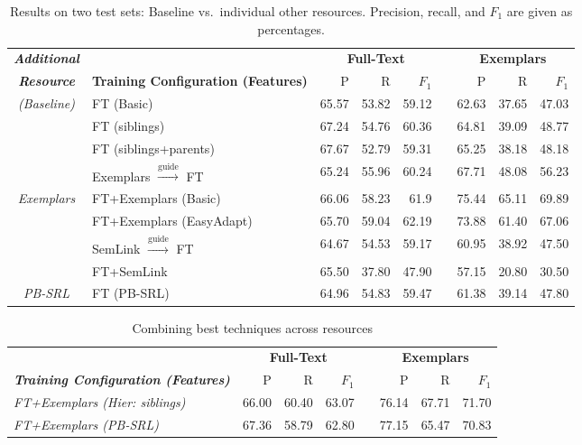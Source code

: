 \begin{table*}\centering\small
\begin{tabular}{>{\itshape}clrrr@{~~}r@{~~}rrr}
\toprule
\normalfont\textbf{Additional} & & \multicolumn{3}{c}{\textbf{Full-Text}} && \multicolumn{3}{c}{\textbf{Exemplars}} \\
\cline{3-5}\cline{7-9}
\normalfont\textbf{Resource} & \textbf{Training Configuration (Features)} & P\hphantom{11} & R\hphantom{11} & $F_1$\hphantom{0} && P\hphantom{11} & R\hphantom{11} & $F_1$\hphantom{0} \\
\midrule
(Baseline) & FT (Basic) & 65.57 & 53.82 & 59.12 && 62.63 & 37.65 & 47.03 \\
\midrule
\multirow{2}{*}{FN Hierarchy} & FT (siblings) & 67.24 & 54.76 & 60.36 && 64.81 & 39.09 & 48.77 \\
          & FT (siblings+parents) & 67.67 & 52.79 & 59.31 && 65.25 & 38.18 & 48.18 \\
\midrule
& Exemplars $\xrightarrow{\text{guide}}$ FT & 65.24 & 55.96 & 60.24 && 67.71 & 48.08 & 56.23\\
Exemplars & FT+Exemplars (Basic) & 66.06 & 58.23 & 61.9 && 75.44 & 65.11 & 69.89 \\
& FT+Exemplars (EasyAdapt) & 65.70 & 59.04 & 62.19 && 73.88 & 61.40 & 67.06 \\
\midrule
\multirow{2}{*}{SemLink} & SemLink $\xrightarrow{\text{guide}}$ FT & 64.67 & 54.53 & 59.17 && 60.95 & 38.92 & 47.50 \\
& FT+SemLink & 65.50 & 37.80 & 47.90 && 57.15 & 20.80 & 30.50 \\
\midrule
PB-SRL & FT (PB-SRL) & 64.96 & 54.83 & 59.47 && 61.38 & 39.14 & 47.80 \\
\bottomrule
\end{tabular}
\caption{Results on two test sets: Baseline vs.~individual other resources. 
Precision, recall, and $F_1$ are given as percentages.}
\label{tbl:results}
\end{table*}

\begin{table*}\centering\small
\begin{tabular}{>{\itshape}lrrr@{~~}r@{~~}rrr}
\toprule
& \multicolumn{3}{c}{\textbf{Full-Text}} && \multicolumn{3}{c}{\textbf{Exemplars}} \\
\cline{2-4}\cline{6-8}
 \textbf{Training Configuration (Features)} & P\hphantom{11} & R\hphantom{11} & $F_1$\hphantom{0} && P\hphantom{11} & R\hphantom{11} & $F_1$\hphantom{0} \\
\midrule
FT+Exemplars (Hier: siblings) &  66.00 & 60.40 & 63.07 && 76.14 & 67.71 & 71.70 \\
FT+Exemplars (PB-SRL) & 67.36 & 58.79 & 62.80 && 77.15 & 65.47 & 70.83 \\
\bottomrule
\end{tabular}
\caption{Combining best techniques across resources }
\label{tbl:bestTech}
\end{table*}
